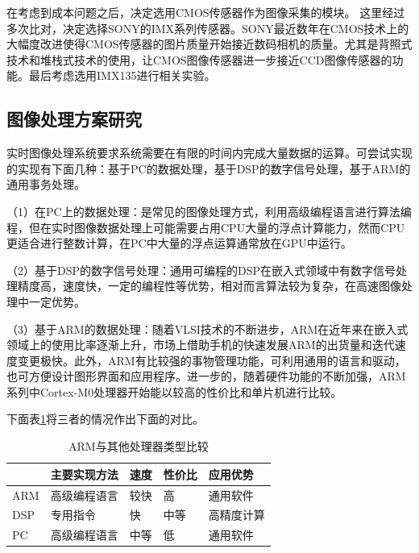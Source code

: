 在考虑到成本问题之后，决定选用CMOS传感器作为图像采集的模块。
这里经过多次比对，决定选择SONY的IMX系列传感器。SONY最近数年在CMOS技术上的大幅度改进使得CMOS传感器的图片质量开始接近数码相机的质量。尤其是背照式技术和堆栈式技术的使用，让CMOS图像传感器进一步接近CCD图像传感器的功能。最后考虑选用IMX135进行相关实验。


\subsection{图像处理方案研究}
实时图像处理系统要求系统需要在有限的时间内完成大量数据的运算。可尝试实现的实现有下面几种：基于PC的数据处理，基于DSP的数字信号处理，基于ARM的通用事务处理。

（1）在PC上的数据处理：是常见的图像处理方式，利用高级编程语言进行算法编程，但在实时图像数据处理上可能需要占用CPU大量的浮点计算能力，然而CPU更适合进行整数计算，在PC中大量的浮点运算通常放在GPU中运行。

（2）基于DSP的数字信号处理：通用可编程的DSP在嵌入式领域中有数字信号处理精度高，速度快，一定的编程性等优势，相对而言算法较为复杂，在高速图像处理中一定优势。

（3）基于ARM的数据处理：随着VLSI技术的不断进步，ARM在近年来在嵌入式领域上的使用比率逐渐上升，市场上借助手机的快速发展ARM的出货量和迭代速度变更极快。此外，ARM有比较强的事物管理功能，可利用通用的语言和驱动，也可方便设计图形界面和应用程序。进一步的，随着硬件功能的不断加强，ARM系列中Cortex-M0处理器开始能以较高的性价比和单片机进行比较。


下面表\ref{table:tabarm}将三者的情况作出下面的对比。


\begin{table}[htbp]
	\centering
	\caption{ARM与其他处理器类型比较}
	\label{table:tabarm}
\begin{tabular}{l|l|l|l|l}
	\toprule
	\rowcolor{mygray}
	    & 主要实现方法   & 速度 &  性价比 & 应用优势 \\
	\midrule
	ARM     & 高级编程语言  & 较快 & 高  & 通用软件  \\
	\rowcolor{mygray}
	DSP       & 专用指令  & 快 & 中等 & 高精度计算 \\
	PC         & 高级编程语言  & 中等 & 低  & 通用软件 \\
	\bottomrule
\end{tabular}
\end{table}

